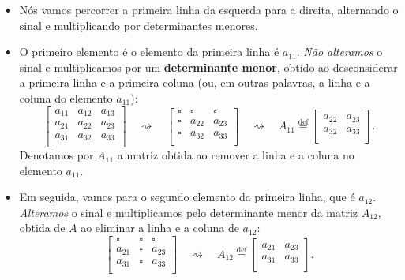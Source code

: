 \begin{itemize}
\item Nós vamos percorrer a primeira linha da esquerda para a direita, alternando o sinal e multiplicando por determinantes menores.
\item O primeiro elemento é o elemento da primeira linha é $a_{11}$. \textit{Não alteramos} o sinal e multiplicamos por um \textbf{determinante menor}, obtido ao desconsiderar a primeira linha e a primeira coluna (ou, em outras palavras, a linha e a coluna do elemento $a_{11}$):
\begin{equation}
\begin{bmatrix}
a_{11} & a_{12} & a_{13} \\
a_{21} & a_{22} & a_{23} \\
a_{31} & a_{32} & a_{33} \\
\end{bmatrix} \quad \rightsquigarrow \quad
\begin{bmatrix}
\square & \square & \square \\
\square & a_{22}  & a_{23} \\
\square & a_{32}  & a_{33} \\
\end{bmatrix} \quad \rightsquigarrow \quad A_{11} \stackrel{\text{def}}{=}
\begin{bmatrix}
a_{22}  & a_{23} \\
a_{32}  & a_{33} \\
\end{bmatrix}.
\end{equation} Denotamos por $A_{11}$ a matriz obtida ao remover a linha e a coluna no elemento $a_{11}$.
\item Em seguida, vamos para o segundo elemento da primeira linha, que é $a_{12}$. \textit{Alteramos} o sinal e multiplicamos pelo determinante menor da matriz $A_{12}$, obtida de $A$ ao eliminar a linha e a coluna de $a_{12}$:
\begin{equation}
\begin{bmatrix}
\square & \square & \square \\
a_{21}  & \square & a_{23} \\
a_{31}  & \square & a_{33} \\
\end{bmatrix} \quad \rightsquigarrow \quad A_{12} \stackrel{\text{def}}{=}
\begin{bmatrix}
a_{21}  & a_{23} \\
a_{31}  & a_{33} \\
\end{bmatrix}.

\end{equation}
\end{itemize}
